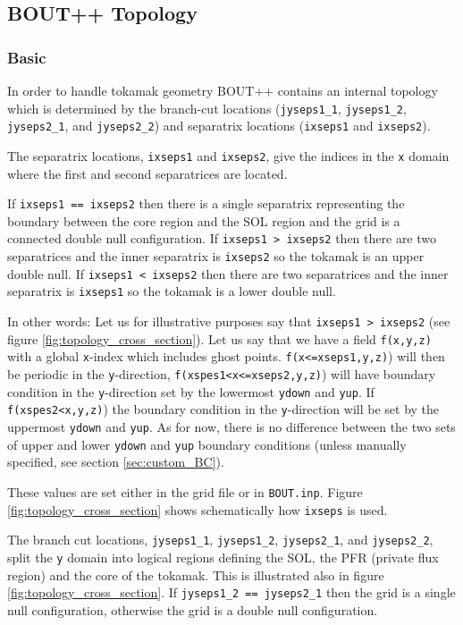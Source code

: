 \documentclass[12pt]{article}
\newcommand{\code}[1]{\texttt{#1}}
\begin{document}
\subsection{BOUT++ Topology}
\subsubsection{Basic}
In order to handle tokamak geometry BOUT++ contains an internal topology which is determined by the branch-cut locations (\code{jyseps1\_1}, \code{jyseps1\_2}, \code{jyseps2\_1}, and
  \code{jyseps2\_2}) and separatrix locations (\code{ixseps1} and  \code{ixseps2}).

The separatrix locations, \code{ixseps1} and  \code{ixseps2}, give the indices 
in the \code{x} domain where the first and second separatrices are located.

If \code{ixseps1 == ixseps2} then there is a single separatrix representing the 
boundary between the core region and the SOL region and the grid is a connected 
double null configuration. If \code{ixseps1 > ixseps2} then there are two 
separatrices and the inner separatrix is \code{ixseps2} so the tokamak is an 
upper double null. If \code{ixseps1 < ixseps2} then there are two separatrices 
and the inner separatrix is \code{ixseps1} so the tokamak is a lower double 
null.

In other words: Let us for illustrative purposes say that \code{ixseps1 >
ixseps2} (see figure \ref{fig:topology_cross_section}). Let us say that we 
have a field \code{f(x,y,z)} with a global \code{x}-index which includes ghost 
points. \code{f(x<=xseps1,y,z)}) will then be periodic in the 
\code{y}-direction, \code{f(xspes1<x<=xseps2,y,z)}) will have boundary condition 
in the \code{y}-direction set by the lowermost \code{ydown} and \code{yup}.
If \code{f(xspes2<x,y,z)}) the boundary condition in the \code{y}-direction 
will be set by the uppermost \code{ydown} and \code{yup}. As for now, there is 
no difference between the two sets of upper and lower \code{ydown} and 
\code{yup} boundary conditions (unless manually specified, see section 
\ref{sec:custom_BC}).

These values are set either in the grid file or in \code{BOUT.inp}. Figure 
\ref{fig:topology_cross_section} shows schematically how \code{ixseps} is used.

The branch cut locations, \code{jyseps1\_1}, \code{jyseps1\_2}, 
\code{jyseps2\_1}, and \code{jyseps2\_2}, split the \code{y} domain into logical 
regions defining the SOL, the PFR (private flux region) and the core of the 
tokamak. This is illustrated also in figure \ref{fig:topology_cross_section}.  
If \code{jyseps1\_2 == jyseps2\_1} then the grid is a single null 
configuration, otherwise the grid is a double null configuration.
\end{document}
